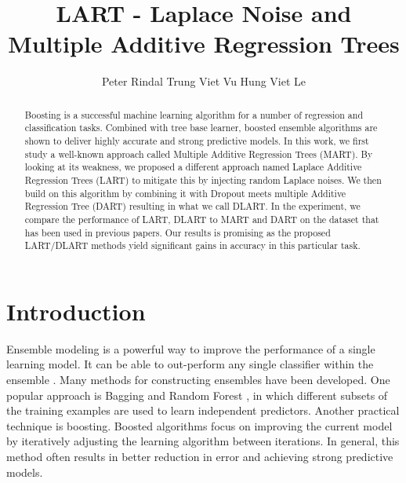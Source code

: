 \documentclass{article} %
\title{LART - Laplace Noise and Multiple Additive Regression Trees}
\author{Peter Rindal 
\And
Trung Viet Vu 
\And
Hung Viet Le}
\begin{document}
 
\maketitle

\begin{abstract}

Boosting is a successful machine learning algorithm for a number of regression and classification tasks. Combined with tree base learner, boosted ensemble algorithms are shown to deliver highly accurate and strong predictive models. In this work, we first study a well-known approach called Multiple Additive Regression Trees (MART). By looking at its weakness, we proposed a different approach named Laplace Additive Regression Trees (LART) to mitigate this by injecting random Laplace noises. We then build on this algorithm by combining it with Dropout meets multiple Additive Regression Tree (DART)\cite{dart} resulting in what we call DLART. In the experiment, we compare the performance of LART, DLART to MART and DART on the dataset that has been used in previous papers. Our results is promising as the proposed LART/DLART methods yield significant gains in accuracy in this particular task.

\end{abstract}

\section{Introduction}


Ensemble modeling is a powerful way to improve the performance of a single learning model.  It can be able to out-perform any single classifier within the ensemble \cite{Dietterich2000}. Many methods for constructing ensembles have been developed. One popular approach is Bagging and Random Forest \cite{Breiman2001}, in which different subsets of the training examples are used to learn independent predictors. Another practical technique is boosting. Boosted algorithms focus on improving the current model by iteratively adjusting the learning algorithm between iterations. In general, this method often results in better reduction in  error and achieving strong predictive models. \\
\end{document}
